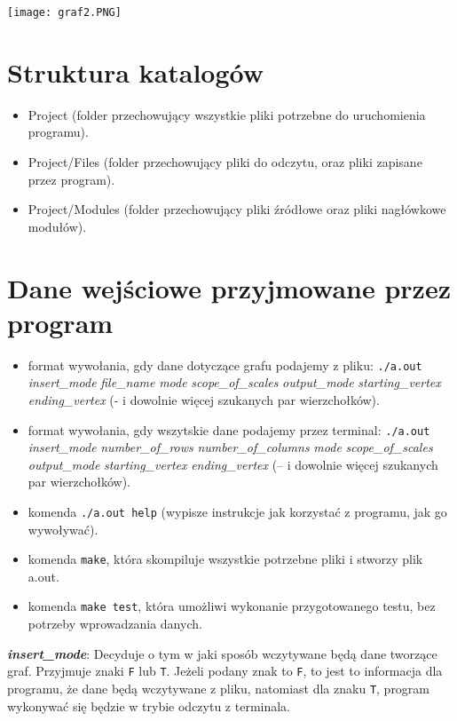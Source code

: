 \documentclass[12pt, a4paper]{article}
\begin{document}
     


\begin{center}
\texttt{[image: graf2.PNG]}
\end{center}

\section{Struktura katalogów}

\begin{itemize}
\item Project (folder przechowujący wszystkie pliki potrzebne do uruchomienia programu).
\item Project/Files (folder przechowujący pliki do odczytu, oraz pliki zapisane przez program).
\item Project/Modules (folder przechowujący pliki źródłowe oraz pliki nagłówkowe modułów).
\end{itemize}


\section{Dane wejściowe przyjmowane przez program}

\begin{itemize}
\item format wywołania, gdy dane dotyczące grafu podajemy z pliku: \texttt{./a.out} \textit{insert\_mode} \textit{file\_name} \textit{mode} \textit{scope\_of\_scales} \textit{output\_mode} \textit{starting\_vertex} \textit{ending\_vertex} (- i dowolnie więcej szukanych par wierzchołków).
\item format wywołania, gdy wszytskie dane podajemy przez terminal: \texttt{./a.out} \textit{insert\_mode} \textit{number\_of\_rows} \textit{number\_of\_columns} \textit{mode} \textit{scope\_of\_scales} \textit{output\_mode} \textit{starting\_vertex} \textit{ending\_vertex} (-- i dowolnie więcej szukanych par wierzchołków).
\item komenda \texttt{./a.out help} (wypisze instrukcje jak korzystać z programu, jak go wywoływać).
\item komenda \texttt{make}, która skompiluje wszystkie potrzebne pliki i stworzy plik a.out.
\item komenda \texttt{make test}, która umożliwi wykonanie przygotowanego testu, bez potrzeby wprowadzania danych.
\end{itemize}

\textbf{\textit{insert\_mode}}: Decyduje o tym w jaki sposób wczytywane będą dane tworzące graf. Przyjmuje znaki \texttt{F} lub \texttt{T}. Jeżeli podany znak to \texttt{F}, to jest to informacja dla programu, że dane będą wczytywane z pliku, natomiast dla znaku \texttt{T}, program wykonywać się będzie w trybie odczytu z terminala.\\
\end{document}
